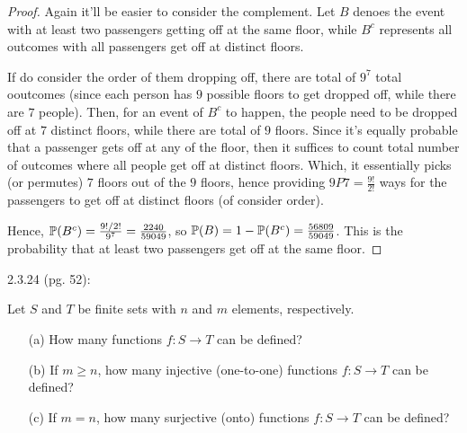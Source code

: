 \documentclass{article}
\begin{document}
\begin{proof}
    Again it'll be easier to consider the complement. Let $B$ denoes the event with at least two passengers getting off at the same floor, while $B^c$ represents all outcomes with all passengers get off at distinct floors.

    If do consider the order of them dropping off, there are total of $9^7$ total ooutcomes (since each person has $9$ possible floors to get dropped off, while there are $7$ people). Then, for an event of $B^c$ to happen, the people need to be dropped off at $7$ distinct floors, while there are total of $9$ floors. Since it's equally probable that a passenger gets off at any of the floor, then it suffices to count total number of outcomes where all people get off at distinct floors. Which, it essentially picks (or permutes) $7$ floors out of the $9$ floors, hence providing $9P7 = \frac{9!}{2!}$ ways for the passengers to get off at distinct floors (of consider order).

    Hence, $\mathbb{P}(B^c)=\frac{9!/2!}{9^7}=\frac{2240}{59049}$, so $\mathbb{P}(B)=1-\mathbb{P}(B^c)=\frac{56809}{59049}$. This is the probability that at least two passengers get off at the same floor.
\end{proof}

\newpage

\begin{ques}\label{q3}
    2.3.24 (pg. 52):

    Let $S$ and $T$ be finite sets with $n$ and $m$ elements, respectively.
    \begin{itemize}
        \item[(a)] How many functions $f:S \rightarrow T$ can be defined?
        \item[(b)] If $m\geq n$, how many injective (one-to-one) functions $f:S \rightarrow T$ can be defined?
        \item[(c)] If $m=n$, how many surjective (onto) functions $f:S \rightarrow T$ can be defined?  
    \end{itemize}
\end{ques}
\end{document}
